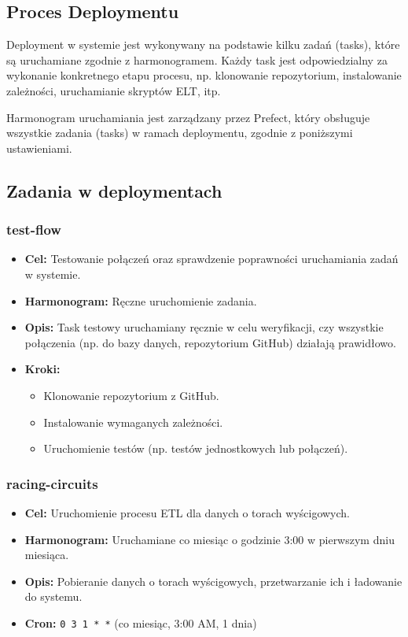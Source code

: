 \documentclass[12pt]{article}
\begin{document}
\subsection{Proces Deploymentu}
Deployment w systemie jest wykonywany na podstawie kilku zadań (tasks), które są uruchamiane zgodnie z harmonogramem. Każdy task jest odpowiedzialny za wykonanie konkretnego etapu procesu, np. klonowanie repozytorium, instalowanie zależności, uruchamianie skryptów ELT, itp.

Harmonogram uruchamiania jest zarządzany przez Prefect, który obsługuje wszystkie zadania (tasks) w ramach deploymentu, zgodnie z poniższymi ustawieniami.

\subsection{Zadania w deploymentach}
\subsubsection{test-flow}
\begin{itemize}
    \item \textbf{Cel:} Testowanie połączeń oraz sprawdzenie poprawności uruchamiania zadań w systemie.
    \item \textbf{Harmonogram:} Ręczne uruchomienie zadania.
    \item \textbf{Opis:} Task testowy uruchamiany ręcznie w celu weryfikacji, czy wszystkie połączenia (np. do bazy danych, repozytorium GitHub) działają prawidłowo.
    \item \textbf{Kroki:}
    \begin{itemize}
        \item Klonowanie repozytorium z GitHub.
        \item Instalowanie wymaganych zależności.
        \item Uruchomienie testów (np. testów jednostkowych lub połączeń).
    \end{itemize}

\end{itemize}

\subsubsection{racing-circuits}
\begin{itemize}
    \item \textbf{Cel:} Uruchomienie procesu ETL dla danych o torach wyścigowych.
    \item \textbf{Harmonogram:} Uruchamiane co miesiąc o godzinie 3:00 w pierwszym dniu miesiąca.
    \item \textbf{Opis:} Pobieranie danych o torach wyścigowych, przetwarzanie ich i ładowanie do systemu.
    \item \textbf{Cron:} \texttt{0 3 1 * *} (co miesiąc, 3:00 AM, 1 dnia)
\end{itemize}
\end{document}
